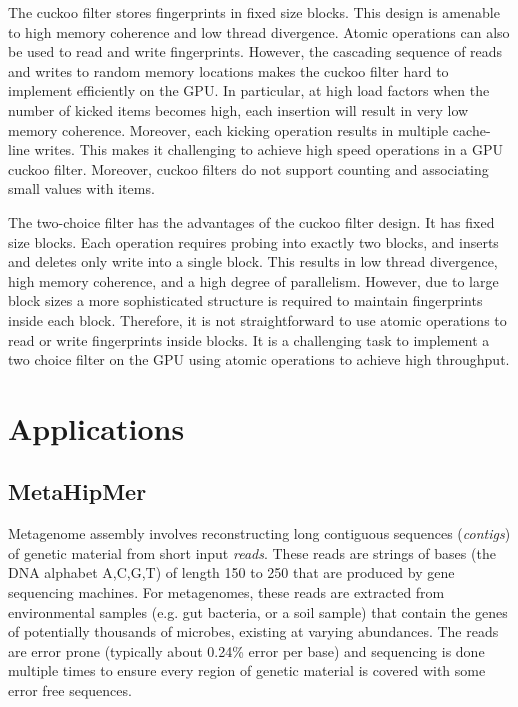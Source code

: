 The cuckoo filter stores fingerprints in fixed size blocks. This design is amenable to high memory coherence and low thread divergence. Atomic operations can also be used to read and write fingerprints. However, the cascading sequence of reads and writes to random memory locations makes the cuckoo filter hard to implement efficiently on the GPU. In particular, at high load factors when the number of kicked items becomes high, each insertion will result in very low memory coherence. Moreover, each kicking operation results in multiple cache-line writes. This makes it challenging to achieve high speed operations in a GPU cuckoo filter. Moreover, cuckoo filters do not support counting and associating small values with items.

The two-choice filter has the advantages of the cuckoo filter design. It has fixed size blocks. Each operation requires probing into exactly two blocks, and inserts and deletes only write into a single block. This results in low thread divergence, high memory coherence, and a high degree of parallelism. However, due to large block sizes a more sophisticated structure is required to maintain fingerprints inside each block. Therefore, it is not straightforward to use atomic operations to read or write fingerprints inside blocks. It is a challenging task to implement a two choice filter on the GPU using atomic operations to achieve high throughput.

\section{Applications}

\subsection{MetaHipMer}

Metagenome assembly involves reconstructing long contiguous sequences ({\it contigs}) of genetic material from short input {\it reads}. These reads are strings of bases (the DNA alphabet A,C,G,T) of length 150 to 250 that are produced by gene sequencing machines. 
For metagenomes, these reads are extracted from environmental samples (e.g. gut bacteria, or a soil sample) that contain the genes of potentially thousands of microbes, existing at varying abundances. 
The reads are error prone (typically about 0.24\% error per base) and sequencing is done multiple times to ensure every region of genetic material is covered with some error free sequences.

